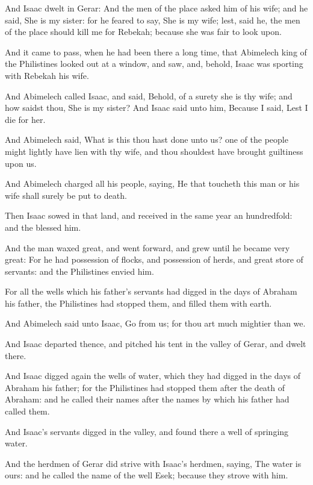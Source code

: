 \Verse And Isaac dwelt in Gerar: \Verse And the men of the place asked him of his wife; and he said, She is my sister: for he feared to say, She is my wife; lest, said he, the men of the place should kill me for Rebekah; because she was fair to look upon.

\Verse And it came to pass, when he had been there a long time, that Abimelech king of the Philistines looked out at a window, and saw, and, behold, Isaac was sporting with Rebekah his wife.

\Verse And Abimelech called Isaac, and said, Behold, of a surety she is thy wife; and how saidst thou, She is my sister? And Isaac said unto him, Because I said, Lest I die for her.

\Verse And Abimelech said, What is this thou hast done unto us? one of the people might lightly have lien with thy wife, and thou shouldest have brought guiltiness upon us.

\Verse And Abimelech charged all his people, saying, He that toucheth this man or his wife shall surely be put to death.

\Verse Then Isaac sowed in that land, and received in the same year an hundredfold: and the \LORD blessed him.

\Verse And the man waxed great, and went forward, and grew until he became very great: \Verse For he had possession of flocks, and possession of herds, and great store of servants: and the Philistines envied him.

\Verse For all the wells which his father's servants had digged in the days of Abraham his father, the Philistines had stopped them, and filled them with earth.

\Verse And Abimelech said unto Isaac, Go from us; for thou art much mightier than we.

\Verse And Isaac departed thence, and pitched his tent in the valley of Gerar, and dwelt there.

\Verse And Isaac digged again the wells of water, which they had digged in the days of Abraham his father; for the Philistines had stopped them after the death of Abraham: and he called their names after the names by which his father had called them.

\Verse And Isaac's servants digged in the valley, and found there a well of springing water.

\Verse And the herdmen of Gerar did strive with Isaac's herdmen, saying, The water is ours: and he called the name of the well Esek; because they strove with him.

